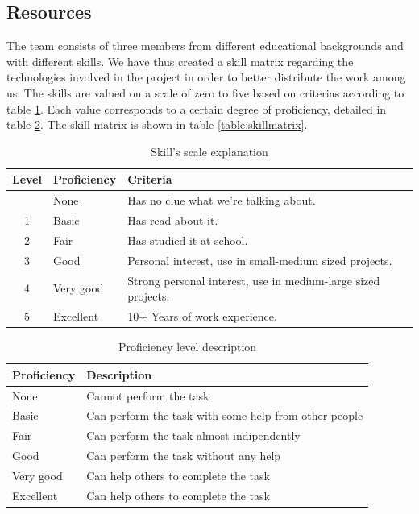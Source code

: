 \subsection{Resources}
The team consists of three members from different educational backgrounds and with different skills.
We have thus created a skill matrix regarding the technologies involved in the project in order to better distribute the work among us.
The skills are valued on a scale of zero to five based on criterias according to table \ref{table:skillscale}.
Each value corresponds to a certain degree of proficiency, detailed in table \ref{table:proficiency}.
The skill matrix is shown in table \ref{table:skillmatrix}.

\begin{table}[h]
\begin{center}
\begin{tabular}{ | c | l | l | }
  \hline
  Level & Proficiency & Criteria \\
  \hline\noalign{\smallskip}\noalign{\smallskip}\hline
  0 & None		& Has no clue what we're talking about. \\
  1 & Basic		& Has read about it.\\
  2 & Fair		& Has studied it at school.\\
  3 & Good		& Personal interest, use in small-medium sized projects.\\
  4 & Very good	& Strong personal interest, use in medium-large sized projects. \\
  5 & Excellent	& 10+ Years of work experience. \\
  \hline
\end{tabular}
\end{center}
\caption{Skill's scale explanation}
\label{table:skillscale}
\end{table}

\begin{table}[h]
\begin{center}
\begin{tabular}{ | l | l | }
  \hline
  Proficiency & Description \\
  \hline\noalign{\smallskip}\noalign{\smallskip}\hline
  None		& Cannot perform the task \\
  Basic		& Can perform the task with some help from other people \\
  Fair		& Can perform the task almost indipendently \\
  Good		& Can perform the task without any help \\
  Very good	& Can help others to complete the task \\
  Excellent	& Can help others to complete the task \\
  \hline
\end{tabular}
\end{center}
\caption{Proficiency level description}
\label{table:proficiency}
\end{table}

